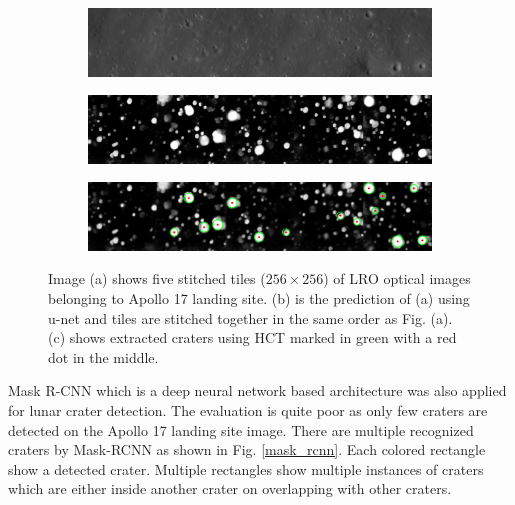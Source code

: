 \documentclass[11pt]{article}
\begin{document}
\begin{figure}[H]
	\begin{subfigure}{\linewidth}
		\centering
		\includegraphics[width=.8\textwidth]{files/results/hcon_thesis-1_original.png}
		\caption{}
	\end{subfigure}\par\medskip
	\begin{subfigure}{\linewidth}
		\centering
		\includegraphics[width=.8\textwidth]{files/results/hcon_thesis-1.png}
		\caption{}
	\end{subfigure}\par\medskip
	\begin{subfigure}{\linewidth}
		\centering
		\includegraphics[width=.8\textwidth]{files/results/with_circles.png}
		\caption{}
	\end{subfigure}
	\caption{Image (a) shows five stitched tiles ($256 \times 256$) of LRO optical images belonging to Apollo 17 landing site. (b) is the prediction of (a) using u-net and tiles are stitched together in the same order as Fig. (a). (c) shows extracted craters using HCT marked in green with a red dot in the middle.}
	\label{hough}
\end{figure}

Mask R-CNN which is a deep neural network based architecture was also applied for lunar crater detection. The evaluation is quite poor as only few craters are detected on the Apollo 17 landing site image. There are multiple recognized craters by Mask-RCNN as shown in Fig. \ref{mask_rcnn}. Each colored rectangle show a detected crater. Multiple rectangles show multiple instances of craters which are either inside another crater on overlapping with other craters. 
\end{document}
